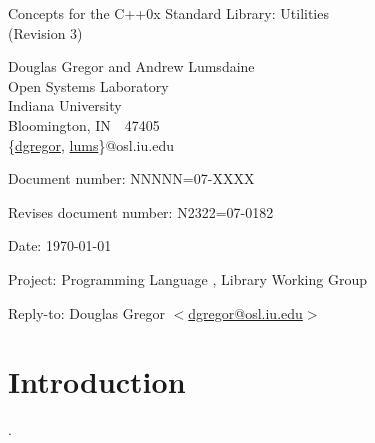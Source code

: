\documentclass[american,twoside]{book}
\begin{document}
\raggedbottom

\begin{titlepage}
\begin{center}
\huge
Concepts for the C++0x Standard Library: Utilities\\
(Revision 3)

\vspace{0.5in}

\normalsize
Douglas Gregor and Andrew Lumsdaine \\
Open Systems Laboratory \\
Indiana University \\
Bloomington, IN\ \  47405 \\
\{\href{mailto:dgregor@osl.iu.edu}{dgregor}, \href{mailto:lums@osl.iu.edu}{lums}\}@osl.iu.edu
\end{center}

\vspace{1in}
\par\noindent Document number: NNNNN=07-XXXX\vspace{-6pt}
\par\noindent Revises document number: N2322=07-0182\vspace{-6pt}
\par\noindent Date: \today\vspace{-6pt}
\par\noindent Project: Programming Language \Cpp{}, Library Working Group\vspace{-6pt}
\par\noindent Reply-to: Douglas Gregor $<$\href{mailto:dgregor@osl.iu.edu}{dgregor@osl.iu.edu}$>$\vspace{-6pt}

\section*{Introduction}
.


\end{titlepage}
\end{document}
